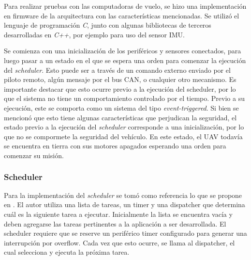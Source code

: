 
Para realizar pruebas con las computadoras de vuelo, se hizo una implementación en firmware de la arquitectura con las características mencionadas. Se utilizó el lenguaje de programación \textit{C}, junto con algunas bibliotecas de terceros desarrolladas en \textit{C++}, por ejemplo para uso del sensor IMU. 


Se comienza con una inicialización de los periféricos y sensores conectados, para luego pasar a un estado en el que se espera una orden para comenzar la ejecución del \textit{scheduler}. Esto puede ser a través de un comando externo enviado por el piloto remoto, algún mensaje por el bus CAN, o cualquier otro mecanismo.
Es importante destacar que esto ocurre previo a la ejecución del scheduler, por lo que el sistema no tiene un comportamiento controlado por el tiempo. Previo a su ejecución, este se comporta como un sistema del tipo \textit{event-triggered}. Si bien se mencionó que esto tiene algunas características que perjudican la seguridad, el estado previo a la ejecución del \textit{scheduler} corresponde a una inicialización, por lo que no se compormete la seguridad del vehículo. En este estado, el UAV todavía se encuentra en tierra con sus motores apagados esperando una orden para comenzar su misión.

\subsubsection{Scheduler}


Para la implementación del \textit{scheduler} se tomó como referencia lo que se propone en \cite{pont2008patterns}. El autor utiliza una lista de tareas, un timer y una dispatcher que determina cuál es la siguiente tarea a ejecutar. Inicialmente la lista se encuentra vacía y deben agregarse las tareas pertinentes a la aplicación a ser desarrollada. El scheduler requiere que se reserve un periférico timer configurado para generar una interrupción por overflow. Cada vez que esto ocurre, se llama al dispatcher, el cual selecciona y ejecuta la próxima tarea.

